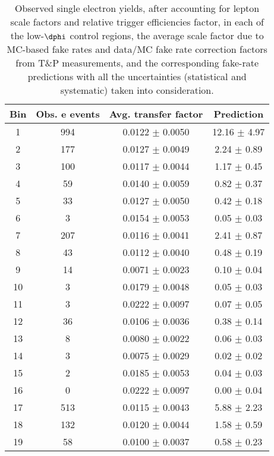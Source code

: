 \begin{table}
\centering
\caption{Observed single electron yields, after accounting for lepton scale factors
and relative trigger efficiencies factor, in each of the low-$\dphi$ control regions, the 
average scale factor due to MC-based fake rates and data/MC fake rate correction
factors from T\&P measurements, and the corresponding fake-rate predictions with all the uncertainties (statistical and systematic) taken into consideration.}
\label{tab:fakeRatePredictions_LDP}
\begin{tabular}{c|c|c|c}
Bin & Obs. e events & Avg. transfer factor  & Prediction \\ \hline\hline
1 & 994  & 0.0122  $\pm$  0.0050  & 12.16 $\pm$ 4.97    \\\hline
2 & 177  & 0.0127  $\pm$  0.0049  & 2.24 $\pm$ 0.89    \\\hline
3 & 100  & 0.0117  $\pm$  0.0044  & 1.17 $\pm$ 0.45    \\\hline
4 & 59  & 0.0140  $\pm$  0.0059  & 0.82 $\pm$ 0.37    \\\hline
5 & 33  & 0.0127  $\pm$  0.0050  & 0.42 $\pm$ 0.18    \\\hline
6 & 3  & 0.0154  $\pm$  0.0053  & 0.05 $\pm$ 0.03    \\\hline
7 & 207  & 0.0116  $\pm$  0.0041  & 2.41 $\pm$ 0.87    \\\hline
8 & 43  & 0.0112  $\pm$  0.0040  & 0.48 $\pm$ 0.19    \\\hline
9 & 14  & 0.0071  $\pm$  0.0023  & 0.10 $\pm$ 0.04    \\\hline
10 & 3  & 0.0179  $\pm$  0.0048  & 0.05 $\pm$ 0.03    \\\hline
11 & 3  & 0.0222  $\pm$  0.0097  & 0.07 $\pm$ 0.05    \\\hline
12 & 36  & 0.0106  $\pm$  0.0036  & 0.38 $\pm$ 0.14    \\\hline
13 & 8  & 0.0080  $\pm$  0.0022  & 0.06 $\pm$ 0.03    \\\hline
14 & 3  & 0.0075  $\pm$  0.0029  & 0.02 $\pm$ 0.02    \\\hline
15 & 2  & 0.0185  $\pm$  0.0053  & 0.04 $\pm$ 0.03    \\\hline
16 & 0  & 0.0222  $\pm$  0.0097  & 0.00 $\pm$ 0.04    \\\hline
17 & 513  & 0.0115  $\pm$  0.0043  & 5.88 $\pm$ 2.23    \\\hline
18 & 132  & 0.0120  $\pm$  0.0044  & 1.58 $\pm$ 0.59    \\\hline
19 & 58  & 0.0100  $\pm$  0.0037  & 0.58 $\pm$ 0.23    \\\hline

\end{tabular}
\end{table}
